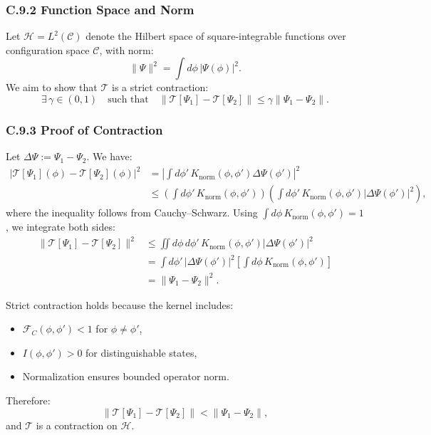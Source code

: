 \subsubsection*{C.9.2 Function Space and Norm}

Let \( \mathcal{H} = L^2(\mathcal{C}) \) denote the Hilbert space of square-integrable functions over configuration space \( \mathcal{C} \), with norm:
\begin{equation}
\| \Psi \|^2 = \int d\phi \, |\Psi(\phi)|^2.
\end{equation}
We aim to show that \( \mathcal{T} \) is a strict contraction:
\begin{equation}
\exists \, \gamma \in (0,1) \quad \text{such that} \quad \|\mathcal{T}[\Psi_1] - \mathcal{T}[\Psi_2]\| \leq \gamma \|\Psi_1 - \Psi_2\|.
\end{equation}

\subsubsection*{C.9.3 Proof of Contraction}

Let \( \Delta \Psi := \Psi_1 - \Psi_2 \). We have:
\begin{align}
\left| \mathcal{T}[\Psi_1](\phi) - \mathcal{T}[\Psi_2](\phi) \right|^2
&= \left| \int d\phi' \, K_{\text{norm}}(\phi, \phi') \Delta \Psi(\phi') \right|^2 \\
&\leq \left( \int d\phi' \, K_{\text{norm}}(\phi, \phi') \right)
\left( \int d\phi' \, K_{\text{norm}}(\phi, \phi') |\Delta \Psi(\phi')|^2 \right),
\end{align}
where the inequality follows from Cauchy--Schwarz. Using \( \int d\phi \, K_{\text{norm}}(\phi, \phi') = 1 \), we integrate both sides:
\begin{align}
\| \mathcal{T}[\Psi_1] - \mathcal{T}[\Psi_2] \|^2
&\leq \iint d\phi \, d\phi' \, K_{\text{norm}}(\phi, \phi') |\Delta \Psi(\phi')|^2 \\
&= \int d\phi' \, |\Delta \Psi(\phi')|^2 \left[ \int d\phi \, K_{\text{norm}}(\phi, \phi') \right] \\
&= \| \Psi_1 - \Psi_2 \|^2.
\end{align}

Strict contraction holds because the kernel includes:
\begin{itemize}
    \item \( \mathcal{F}_C(\phi, \phi') < 1 \) for \( \phi \ne \phi' \),
    \item \( I(\phi, \phi') > 0 \) for distinguishable states,
    \item Normalization ensures bounded operator norm.
\end{itemize}
Therefore:
\begin{equation}
\| \mathcal{T}[\Psi_1] - \mathcal{T}[\Psi_2] \| < \| \Psi_1 - \Psi_2 \|,
\end{equation}
and \( \mathcal{T} \) is a contraction on \( \mathcal{H} \).

